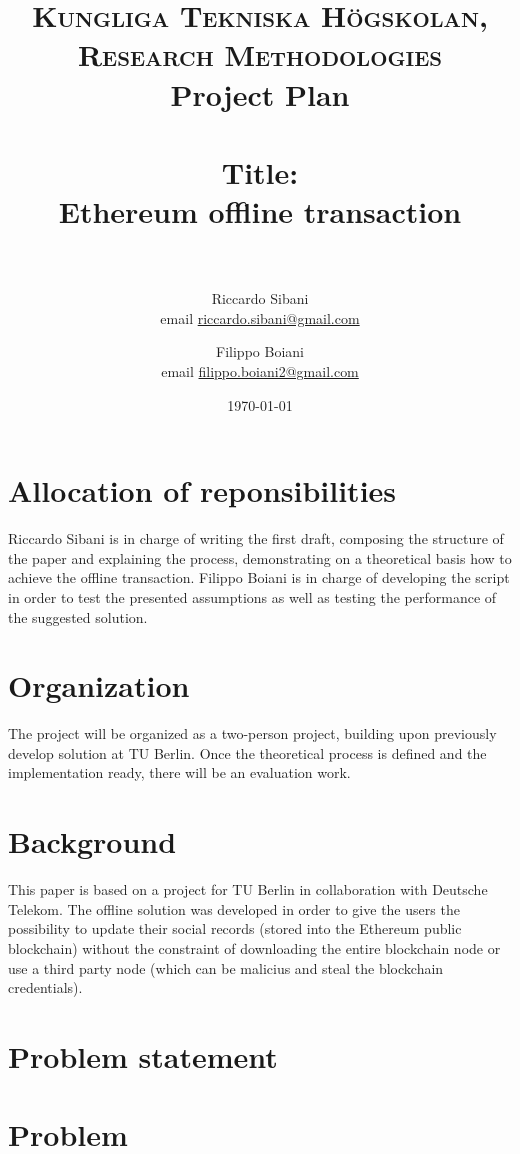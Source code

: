 \documentclass[paper=a4, fontsize=11pt]{scrartcl} %
\title{
\normalfont \normalsize
\textsc{Kungliga Tekniska Högskolan, Research Methodologies} \\ [10pt] %
Project Plan \\ [25pt]
\horrule{0.5pt} \\[0.4cm] %
\huge Title:\\Ethereum offline transaction \\ %
\vspace{5mm}
\horrule{2pt} \\[0.5cm] %
}
\author{Riccardo Sibani \\ email \href{mailto:riccardo.sibani@gmail.com}{riccardo.sibani@gmail.com}
   \and Filippo Boiani \\ email \href{mailto:filippo.boiani2@gmail.com}{filippo.boiani2@gmail.com} } %
\date{\normalsize\today} %
\numberwithin{equation}{section} %
\numberwithin{figure}{section} %
\numberwithin{table}{section} %
\begin{document}
\maketitle %


\section{Allocation of reponsibilities}
Riccardo Sibani is in charge of writing the first draft, composing the structure of the paper and explaining the process, demonstrating on a theoretical basis how to achieve the offline transaction.
Filippo Boiani is in charge of developing the script in order to test the presented assumptions as well as testing the performance of the suggested solution.

\section{Organization}
The project will be organized as a two-person project, building upon previously develop solution at TU Berlin. Once the theoretical process is defined and the implementation ready, there will be an evaluation work.

\section{Background}

This paper is based on a project for TU Berlin in collaboration with Deutsche Telekom. The offline solution was developed in order to give the users the possibility to update their social records (stored into the Ethereum public blockchain) without the constraint of downloading the entire blockchain node or use a third party node (which can be malicius and steal the blockchain credentials).

\section{Problem statement}


\section{Problem}
\end{document}
